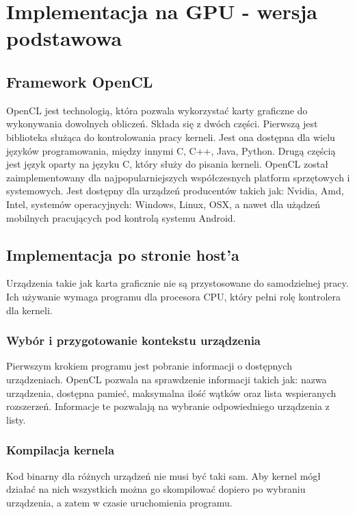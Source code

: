 
\section { Implementacja na GPU - wersja podstawowa }

\subsection{ Framework OpenCL }

OpenCL jest technologią, która pozwala wykorzystać karty graficzne do wykonywania dowolnych obliczeń. Składa się z dwóch części. Pierwszą jest biblioteka służąca do kontrolowania pracy kerneli. Jest ona dostępna dla wielu języków programowania, między innymi C, C++, Java, Python. Drugą częścią jest język oparty na języku C, który służy do pisania kerneli.
\linebreak
OpenCL został zaimplementowany dla najpopularniejszych współczesnych platform sprzętowych i systemowych. Jest dostępny dla urządzeń producentów takich jak: Nvidia, Amd, Intel, systemów operacyjnych: Windows, Linux, OSX, a nawet dla użądzeń mobilnych pracujących pod kontrolą systemu Android.



\subsection{ Implementacja po stronie host'a }

Urządzenia takie jak karta graficznie nie są przystosowane do samodzielnej pracy. Ich używanie wymaga programu dla procesora CPU, który pełni rolę kontrolera dla kerneli.

\subsubsection{ Wybór i przygotowanie kontekstu urządzenia }
Pierwszym krokiem programu jest pobranie informacji o dostępnych urządzeniach. OpenCL pozwala na sprawdzenie informacji takich jak: nazwa urządzenia, dostępna pamieć, maksymalna ilość wątków oraz lista wspieranych rozszerzeń. Informacje te pozwalają na wybranie odpowiedniego urządzenia z listy.

\subsubsection{ Kompilacja kernela }
Kod binarny dla różnych urządzeń nie musi być taki sam. Aby kernel mógł działać na nich wszystkich można go skompilować dopiero po wybraniu urządzenia, a zatem w czasie uruchomienia programu. 

